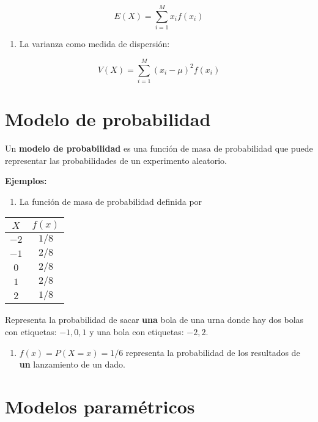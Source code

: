 \documentclass[
]{book}
\providecommand{\tightlist}{%
  \setlength{\itemsep}{0pt}\setlength{\parskip}{0pt}}
\begin{document}
\[E(X)= \sum_{i=1}^M x_i f(x_i)\]

\begin{enumerate}
\def\labelenumi{\arabic{enumi})}
\setcounter{enumi}{1}
\tightlist
\item
  La varianza como medida de dispersión:
\end{enumerate}

\[V(X)= \sum_{i=1}^M (x_i-\mu)^2 f(x_i)\]

\hypertarget{modelo-de-probabilidad}{%
\section{Modelo de probabilidad}\label{modelo-de-probabilidad}}

Un \textbf{modelo de probabilidad} es una función de masa de probabilidad que puede representar las probabilidades de un experimento aleatorio.

\textbf{Ejemplos:}

\begin{enumerate}
\def\labelenumi{\arabic{enumi})}
\tightlist
\item
  La función de masa de probabilidad definida por
\end{enumerate}

\begin{longtable}[]{@{}cc@{}}
\toprule
\(X\) & \(f(x)\) \\
\midrule
\endhead
\(-2\) & \(1/8\) \\
\(-1\) & \(2/8\) \\
\(0\) & \(2/8\) \\
\(1\) & \(2/8\) \\
\(2\) & \(1/8\) \\
\bottomrule
\end{longtable}

Representa la probabilidad de sacar \textbf{una} bola de una urna donde hay dos bolas con etiquetas: \(-1, 0, 1\) y una bola con etiquetas: \(-2, 2\).

\begin{enumerate}
\def\labelenumi{\arabic{enumi})}
\setcounter{enumi}{1}
\tightlist
\item
  \(f(x)=P(X=x)=1/6\) representa la probabilidad de los resultados de \textbf{un} lanzamiento de un dado.
\end{enumerate}

\hypertarget{modelos-paramuxe9tricos}{%
\section{Modelos paramétricos}\label{modelos-paramuxe9tricos}}
\end{document}
